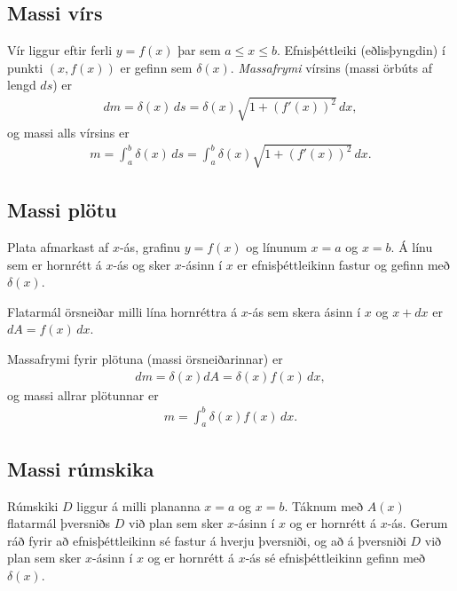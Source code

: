 \documentclass[a4paper,10pt,icelandic]{sphinxmanual}
\begin{document}
\subsection{Massi vírs}
\label{kafli07:massi-virs}\label{kafli07:index-10}
Vír liggur eftir ferli \(y=f(x)\) þar sem \(a\leq x\leq b\).
Efnisþéttleiki (eðlisþyngdin) í punkti \((x, f(x))\) er gefinn sem
\(\delta(x)\). \emph{Massafrymi} vírsins (massi örbúts af lengd
\(ds\)) er
\begin{equation*}
\begin{split}dm
= \delta(x)\, ds
=\delta(x)\sqrt{1+(f'(x))^2}\, dx,\end{split}
\end{equation*}
og massi alls vírsins er
\begin{equation*}
\begin{split}m=\int_a^b \delta(x)\,ds=\int_a^b \delta(x)\sqrt{1+(f'(x))^2}\, dx.\end{split}
\end{equation*}

\subsection{Massi plötu}
\label{kafli07:index-11}\label{kafli07:massi-plotu}\label{kafli07:id4}
Plata afmarkast af \(x\)-ás, grafinu \(y=f(x)\) og línunum
\(x=a\) og \(x=b\). Á línu sem er hornrétt á \(x\)-ás og
sker \(x\)-ásinn í \(x\) er efnisþéttleikinn fastur og gefinn
með \(\delta(x)\).

Flatarmál örsneiðar milli lína hornréttra á \(x\)-ás sem skera ásinn
í \(x\) og \(x+dx\) er \(dA=f(x)\,dx\).

Massafrymi fyrir plötuna (massi örsneiðarinnar) er
\begin{equation*}
\begin{split}dm =\delta(x)dA = \delta(x) f(x)\,dx,\end{split}
\end{equation*}
og massi allrar plötunnar er
\begin{equation*}
\begin{split}m=\int_a^b \delta(x)f(x)\,dx.\end{split}
\end{equation*}

\subsection{Massi rúmskika}
\label{kafli07:index-12}\label{kafli07:massi-rumskika}
Rúmskiki \(D\) liggur á milli plananna \(x=a\) og \(x=b\).
Táknum með \(A(x)\) flatarmál þversniðs \(D\) við plan sem sker
\(x\)-ásinn í \(x\) og er hornrétt á \(x\)-ás. Gerum ráð
fyrir að efnisþéttleikinn sé fastur á hverju þversniði, og að á
þversniði \(D\) við plan sem sker \(x\)-ásinn í \(x\) og er
hornrétt á \(x\)-ás sé efnisþéttleikinn gefinn með
\(\delta(x)\).
\end{document}
